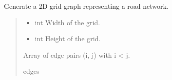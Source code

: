 \documentclass[letterpaper,10pt,english]{sphinxmanual}
\begin{document}
\begin{fulllineitems}
\label{\detokenize{graphem:graphem.generators.generate_road_network}}
\pysigstartsignatures
{}
\pysigstopsignatures
\sphinxAtStartPar
Generate a 2D grid graph representing a road network.
\begin{quote}\begin{description}
\begin{itemize}
\item {} 
\sphinxAtStartPar
{} \textendash{} int
Width of the grid.

\item {} 
\sphinxAtStartPar
{} \textendash{} int
Height of the grid.

\end{itemize}

\sphinxAtStartPar
\begin{description}
\sphinxAtStartPar
Array of edge pairs (i, j) with i \textless{} j.

\end{description}


\sphinxAtStartPar
edges

\end{description}\end{quote}

\end{fulllineitems}

\end{document}
